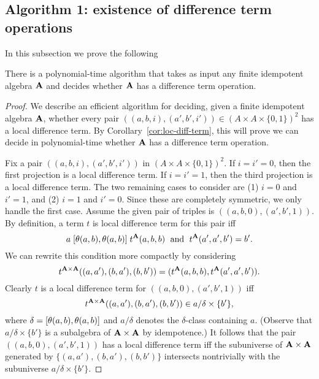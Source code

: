 \draftsecskip

\subsection{Algorithm 1: existence of difference term operations}
In this subsection we prove the following
\begin{cor}
  There is a polynomial-time algorithm that takes as input
  any finite idempotent algebra $\mathbf{A}$ and decides whether
  $\mathbf{A}$ has a difference term operation.
\end{cor}
\begin{proof}
  We describe an efficient algorithm for deciding,
  given a finite idempotent algebra $\mathbf{A}$,
  whether every pair $((a,b,i), (a',b',i')) \in (A\times A \times \{0,1\})^2$ has a local
  difference term.  By Corollary~\ref{cor:loc-diff-term}, this will prove we
  can decide in polynomial-time whether $\mathbf{A}$ has a difference term operation.

  Fix a pair
  $((a,b,i), (a',b',i'))$ in $(A\times A \times \{0,1\})^2$. If $i = i' = 0$,
  then the first projection is a local difference term. If $i = i' = 1$,  
    then the third projection is a local difference term. The two remaining cases to
    consider are (1) $i = 0$ and $i'=1$, and (2)
    $i = 1$ and $i'=0$. Since these are completely symmetric, we only handle the
    first case. Assume  the given pair of triples is
    $((a,b,0), (a',b',1))$.  By definition, a term $t$ is local difference term
    for this pair iff
    \[
    a\mathrel{[\theta(a,b), \theta(a,b)]} t^{\mathbf{A}}(a,b,b) \; \text{ and } \;
    t^{\mathbf{A}}(a',a',b') = b'.
    \]
    We can rewrite this condition more compactly by
    considering 
    \[t^{\mathbf{A}\times \mathbf{A}}((a,a'), (b,a'), (b,b')) =
    (t^{\mathbf{A}}(a,b,b),t^{\mathbf{A}}(a',a',b')).\]
    Clearly $t$ is a local difference term for
    $((a,b,0), (a',b',1))$ iff
    \[
    t^{\mathbf{A}\times \mathbf{A}}((a,a'), (b,a'), (b,b'))\in a/\delta \times \{b'\},
    \]
    where $\delta = [\theta(a,b), \theta(a,b)]$ and $a/\delta$ denotes the
    $\delta$-class containing $a$.
    (Observe that $a/\delta \times \{b'\}$ is a subalgebra of $\mathbf{A} \times \mathbf{A}$
    by idempotence.)
    It follows that the pair
    $((a,b,0), (a',b',1))$ has a local difference term iff
    the subuniverse of $\mathbf{A}\times \mathbf{A}$ generated by
    $\{(a,a'), (b,a'), (b,b')\}$ intersects nontrivially with the subuniverse
    $a/\delta \times \{b'\}$.


\end{proof}
